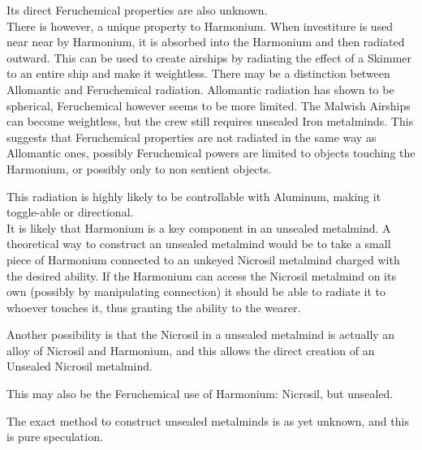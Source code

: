\documentclass[conference]{IEEEtran}
\begin{document}
Its direct Feruchemical properties are also unknown.\\

There is however, a unique property to Harmonium.  When investiture is used near near by Harmonium, it is absorbed into the Harmonium and then radiated outward.\cite{BoM-CH17}  This can be used to create airships by radiating the effect of a Skimmer to an entire ship and make it weightless.\cite{BoM-CH21}  There may be a distinction between Allomantic and Feruchemical radiation.  Allomantic radiation has shown to be spherical,\cite{BoM-CH17} Feruchemical however seems to be more limited.  The Malwish Airships can become weightless, but the crew still requires unsealed Iron metalminds.\cite{BoM-CH21}  This suggests that Feruchemical properties are not radiated in the same way as Allomantic ones, possibly Feruchemical powers are limited to objects touching the Harmonium, or possibly only to non sentient objects.

This radiation is highly likely to be controllable with Aluminum, making it toggle-able or directional.\\

It is likely that Harmonium is a key component in an unsealed metalmind.  A theoretical way to construct an unsealed metalmind would be to take a small piece of Harmonium connected to an unkeyed Nicrosil metalmind charged with the desired ability.  If the Harmonium can access the Nicrosil metalmind on its own (possibly by manipulating connection) it should be able to radiate it to whoever touches it, thus granting the ability to the wearer. 

Another possibility is that the Nicrosil in a unsealed metalmind is actually an alloy of Nicrosil and Harmonium, and this allows the direct creation of an Unsealed Nicrosil metalmind.

This may also be the Feruchemical use of Harmonium: Nicrosil, but unsealed.

The exact method to construct unsealed metalminds is as yet unknown, and this is pure speculation.  
\end{document}
